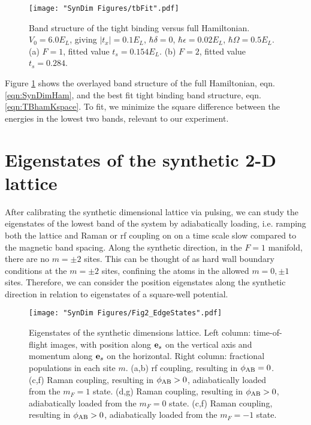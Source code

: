 \begin{figure}
	\texttt{[image: "SynDim Figures/tbFit".pdf]}
\caption[Band structure of the tight binding versus full Hamiltonian]{Band structure of the tight binding versus full Hamiltonian. $V_0=6.0 E_L$, giving $|t_x|=0.1 E_L$, $\hbar\delta=0$, $\hbar\epsilon=0.02 E_L$, $\hbar\Omega=0.5 E_L$. (a) $F=1$, fitted value $t_s=0.154 E_L$. (b) $F=2$, fitted value $t_s=0.284$. }
\label{fig:tbFit}
\end{figure}

Figure \ref{fig:tbFit} shows the overlayed band structure of the full Hamiltonian, eqn. \ref{eqn:SynDimHam}, and the best fit tight binding band structure, eqn. \ref{eqn:TBhamKspace}. To fit, we minimize the square difference between the energies in the lowest two bands, relevant to our experiment. 

\section{Eigenstates of the synthetic 2-D lattice}

After calibrating the synthetic dimensional lattice via pulsing, we can study the eigenstates of the lowest band of the system by adiabatically loading, i.e. ramping both the lattice and Raman or rf coupling on on a time scale slow compared to the magnetic band spacing. Along the synthetic direction, in the $F=1$ manifold, there are no $m=\pm2$ sites. This can be thought of as hard wall boundary conditions at the $m=\pm2$ sites, confining the atoms in the allowed $m=0,\pm1$ sites. Therefore, we can consider the position eigenstates along the synthetic direction in relation to eigenstates of a square-well potential. 

\begin{figure}
	\texttt{[image: "SynDim Figures/Fig2\_EdgeStates".pdf]}
\caption[Eigenstates of the synthetic dimensions lattice]{Eigenstates of the synthetic dimensions lattice. Left column: time-of-flight images, with position along $\textbf{e}_s{}$ on the vertical axis and momentum along $\textbf{e}_s{}$ on the horizontal. Right column: fractional populations in each site $m$.  (a,b) rf coupling, resulting in $\phi_{\rm AB}=0$. (c,f) Raman coupling, resulting in $\phi_{\rm AB}>0$, adiabatically loaded from the $m_F=1$ state.  (d,g) Raman coupling, resulting in $\phi_{\rm AB}>0$, adiabatically loaded from the $m_F=0$ state. (c,f) Raman coupling, resulting in $\phi_{\rm AB}>0$, adiabatically loaded from the $m_F=-1$ state.}
\label{fig:TOFeigenstates}
\end{figure}

